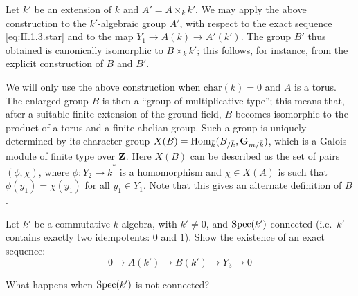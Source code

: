 \begin{remarks}
\begin{nlist}
\item Let $k'$ be an extension of $k$ and $A' = A \times_k k'$.  We may
apply the above construction to the $k'$-algebraic group $A'$, with
respect to the exact sequence \eqref{eq:II.1.3.star} and to the map
$Y_1 \to A(k) \to A'(k')$.  The group $B'$ thus obtained is canonically
isomorphic to $B \times_k k'$; this follows, for instance, from the
explicit construction of $B$ and $B'$.

\item We will only use the above construction when $\mathrm{char}(k) = 0$
and $A$ is a torus.  The enlarged group $B$ is then a ``group of
multiplicative type''; this means that, after a suitable finite extension
of the ground field, $B$ becomes isomorphic to the product of a torus and
a finite abelian group.  Such a group is uniquely determined by its
character group $X(B) = \mathrm{Hom}_{\bar{k}}(B_{/\bar{k}},
\mathbf{G}_{m/\bar{k}})$, which is a Galois-module of finite type over
$\mathbf{Z}$.  Here $X(B)$ can be described as the set of pairs $(\phi, \chi)$,
where $\phi\colon Y_2 \to \bar{k}^*$ is a homomorphism and
$\chi \in X(A)$ is such that $\phi(y_1) = \chi(y_1)$ for all
$y_1 \in Y_1$.  Note that this gives an alternate definition of $B$.
\end{nlist}
\end{remarks}

\begin{alist}
\item[a)] Let $k'$ be a commutative $k$-algebra, with $k' \neq 0$, and
$\mathrm{Spec}(k')$ connected (i.e.~$k'$ contains exactly two idempotents: $0$
and $1$).  Show the existence of an exact sequence:
\[
0 \longrightarrow A(k') \longrightarrow B(k') \longrightarrow Y_3
\longrightarrow 0
\]
\item[b)] What happens when $\mathrm{Spec}(k')$ is not connected?
\end{alist}
